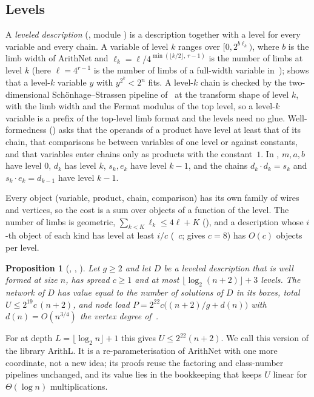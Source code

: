 \documentclass[10pt]{amsart}
\theoremstyle{plain}
\newtheorem{proposition}[theorem]{Proposition}
\theoremstyle{definition}
\theoremstyle{remark}
\numberwithin{equation}{section}
\begin{document}
\subsection{Levels}
A \emph{leveled description} (, module ) is a description together with a
level for every variable and every chain. A variable of level $k$ ranges over $[0,2^{b\ell_k})$, where
$b$ is the limb width of ArithNet and $\ell_k=\ell/4^{\min(\lfloor k/2\rfloor,\,r-1)}$ is the number of
limbs at level $k$ (here $\ell=4^{r-1}$ is the number of limbs of a full-width variable in~\cite{TulFac26});  shows that a
level-$k$ variable $y$ with $y^{2^k}<2^n$ fits. A level-$k$ chain is checked by the two-dimensional
Sch\"onhage--Strassen pipeline of~\cite{TulFac26} at the transform shape of level $k$, with the limb width
and the Fermat modulus of the top level, so a level-$k$ variable is a prefix of the top-level limb
format and the levels need no glue. Well-formedness () asks that the operands of a
product have level at least that of its chain, that comparisons be between variables of one level or
against constants, and that variables enter chains only as products with the constant~$1$. In
, $m,a,b$ have level $0$, $d_k$ has level $k$, $s_k,e_k$ have level $k-1$, and the chains
$d_k\cdot d_k=s_k$ and $s_k\cdot e_k=d_{k-1}$ have level $k-1$.

Every object (variable, product, chain, comparison) has its own family of wires and vertices, so the
cost is a sum over objects of a function of the level. The number of limbs is geometric,
$\sum_{k<K}\ell_k\le4\ell+K$ (), and a description whose $i$-th object of each kind has
level at least $i/c$ (~$c$;  gives $c=8$) has $O(c)$ objects
per level.

\begin{proposition}[, , ]\label{prop:arithl}
Let $g\ge2$ and let $D$ be a leveled description that is well formed at size $n$, has spread $c\ge1$ and
at most $\lfloor\log_2(n+2)\rfloor+3$ levels. The network of $D$ has value equal to the number of solutions
of $D$ in its boxes, total $U\le2^{19}c\,(n+2)$, and node load
$P=2^{22}c\bigl((n+2)/g+d(n)\bigr)$ with $d(n)=O(n^{3/4})$ the vertex degree of~\cite{TulCN26}.
\end{proposition}

\noindent For  at depth $L=\lfloor\log_2n\rfloor+1$ this gives $U\le2^{22}(n+2)$. We call
this version of the library ArithL. It is a re-parameterisation of ArithNet with one more coordinate,
not a new idea; its proofs reuse the factoring and class-number pipelines unchanged, and its value lies
in the bookkeeping that keeps $U$ linear for $\Theta(\log n)$ multiplications.
\end{document}
